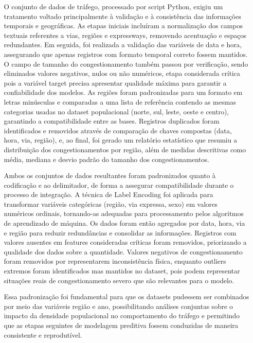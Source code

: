 \documentclass[conference]{IEEEtran}
\begin{document}
O conjunto de dados de tráfego, processado por script Python, exigiu um tratamento voltado principalmente à validação e à consistência das informações temporais e geográficas. As etapas iniciais incluíram a normalização dos campos textuais referentes a vias, regiões e expressways, removendo acentuação e espaços redundantes. Em seguida, foi realizada a validação das variáveis de data e hora, assegurando que apenas registros com formato temporal correto fossem mantidos. O campo de tamanho do congestionamento também passou por verificação, sendo eliminados valores negativos, nulos ou não numéricos, etapa considerada crítica pois a variável target precisa apresentar qualidade máxima para garantir a confiabilidade dos modelos. As regiões foram padronizadas para um formato em letras minúsculas e comparadas a uma lista de referência contendo as mesmas categorias usadas no dataset populacional (norte, sul, leste, oeste e centro), garantindo a compatibilidade entre as bases. Registros duplicados foram identificados e removidos através de comparação de chaves compostas (data, hora, via, região), e, ao final, foi gerado um relatório estatístico que resumiu a distribuição dos congestionamentos por região, além de medidas descritivas como média, mediana e desvio padrão do tamanho dos congestionamentos.

Ambos os conjuntos de dados resultantes foram padronizados quanto à codificação e ao delimitador, de forma a assegurar compatibilidade durante o processo de integração. A técnica de Label Encoding foi aplicada para transformar variáveis categóricas (região, via expressa, sexo) em valores numéricos ordinais, tornando-as adequadas para processamento pelos algoritmos de aprendizado de máquina. Os dados foram então agregados por data, hora, via e região para reduzir redundâncias e consolidar as informações. Registros com valores ausentes em features consideradas críticas foram removidos, priorizando a qualidade dos dados sobre a quantidade. Valores negativos de congestionamento foram removidos por representarem inconsistência física, enquanto outliers extremos foram identificados mas mantidos no dataset, pois podem representar situações reais de congestionamento severo que são relevantes para o modelo.

Essa padronização foi fundamental para que os datasets pudessem ser combinados por meio das variáveis região e ano, possibilitando análises conjuntas sobre o impacto da densidade populacional no comportamento do tráfego e permitindo que as etapas seguintes de modelagem preditiva fossem conduzidas de maneira consistente e reprodutível.
\end{document}
